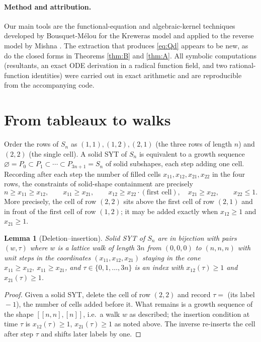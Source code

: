 \documentclass[11pt]{article}
\newtheorem{lemma}[theorem]{Lemma}
\begin{document}
\paragraph{Method and attribution.} Our main tools are the functional-equation and algebraic-kernel techniques developed by Bousquet-M\'elou for the Kreweras model \cite{BM05} and applied to the reverse model by Mishna \cite{Mishna}. The extraction that produces \eqref{eq:Qd} appears to be new, as do the closed forms in Theorems \ref{thm:B} and \ref{thm:A}. All symbolic computations (resultants, an exact ODE derivation in a radical function field, and two rational-function identities) were carried out in exact arithmetic and are reproducible from the accompanying code.

\section{From tableaux to walks}\label{sec:bij}
Order the rows of $S_n$ as $(1,1),(1,2),(2,1)$ (the three rows of length $n$) and $(2,2)$ (the single cell). A solid SYT of $S_n$ is equivalent to a growth sequence $\varnothing = P_0 \subset P_1 \subset \cdots \subset P_{3n+1} = S_n$ of solid subshapes, each step adding one cell. Recording after each step the number of filled cells $x_{11},x_{12},x_{21},x_{22}$ in the four rows, the constraints of solid-shape containment are precisely
\[ n \ge x_{11} \ge x_{12},\qquad x_{11}\ge x_{21},\qquad x_{12}\ge x_{22}\cdot(\text{first cell}),\quad x_{21}\ge x_{22}, \qquad x_{22}\le 1 . \]
More precisely, the cell of row $(2,2)$ sits above the first cell of row $(2,1)$ and in front of the first cell of row $(1,2)$; it may be added exactly when $x_{12}\ge1$ and $x_{21}\ge1$.

\begin{lemma}[Deletion--insertion]\label{lem:bij}
Solid SYT of $S_n$ are in bijection with pairs $(w,\tau)$ where $w$ is a lattice walk of length $3n$ from $(0,0,0)$ to $(n,n,n)$ with unit steps in the coordinates $(x_{11},x_{12},x_{21})$ staying in the cone $x_{11}\ge x_{12},\ x_{11}\ge x_{21}$, and $\tau\in\{0,1,\dots,3n\}$ is an index with $x_{12}(\tau)\ge1$ and $x_{21}(\tau)\ge1$.
\end{lemma}
\begin{proof}
Given a solid SYT, delete the cell of row $(2,2)$ and record $\tau=$ (its label${}-1$), the number of cells added before it. What remains is a growth sequence of the shape $[[n,n],[n]]$, i.e.\ a walk $w$ as described; the insertion condition at time $\tau$ is $x_{12}(\tau)\ge1$, $x_{21}(\tau)\ge1$ as noted above. The inverse re-inserts the cell after step $\tau$ and shifts later labels by one. \end{proof}
\end{document}
